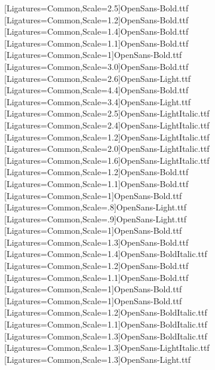 \setsansfont[Ligatures=Common,Scale=1,SlantedFont={OpenSans-LightItalic.ttf},BoldFont={OpenSans-Bold.ttf},BoldSlantedFont={OpenSans-BoldItalic.ttf}]{OpenSans-Light.ttf} %
\newfontface{\sfbHugeRomeo}[Ligatures=Common,Scale=2.5]{OpenSans-Bold.ttf}
\newfontface{\cmssbxparttocRomeo}[Ligatures=Common,Scale=1.2]{OpenSans-Bold.ttf}
\newfontface{\cmssbxsectionRomeo}[Ligatures=Common,Scale=1.4]{OpenSans-Bold.ttf}
\newfontface{\cmssbxelevenRomeo}[Ligatures=Common,Scale=1.1]{OpenSans-Bold.ttf}
\newfontface{\cmssbxchaptocRomeo}[Ligatures=Common,Scale=1]{OpenSans-Bold.ttf}
\newfontface{\cmssbxchaptitleRomeo}[Ligatures=Common,Scale=3.0]{OpenSans-Bold.ttf}
\newfontface{\cmsschapnameRomeo}[Ligatures=Common,Scale=2.6]{OpenSans-Light.ttf}
\newfontface{\cmssbxpartRomeo}[Ligatures=Common,Scale=4.4]{OpenSans-Bold.ttf}
\newfontface{\cmssparttitleRomeo}[Ligatures=Common,Scale=3.4]{OpenSans-Light.ttf}
\newfontface{\sfiHugeRomeo}[Ligatures=Common,Scale=2.5]{OpenSans-LightItalic.ttf}
\newfontface{\sfititleRomeo}[Ligatures=Common,Scale=2.4]{OpenSans-LightItalic.ttf}
\newfontface{\sfitwelveRomeo}[Ligatures=Common,Scale=1.2]{OpenSans-LightItalic.ttf}
\newfontface{\sfihalftitleRomeo}[Ligatures=Common,Scale=2.0]{OpenSans-LightItalic.ttf}
\newfontface{\sfiauthorRomeo}[Ligatures=Common,Scale=1.6]{OpenSans-LightItalic.ttf}
\newfontface{\sfblargeRomeo}[Ligatures=Common,Scale=1.2]{OpenSans-Bold.ttf}
\newfontface{\sfbelevenRomeo}[Ligatures=Common,Scale=1.1]{OpenSans-Bold.ttf}
\newfontface{\sfbRomeo}[Ligatures=Common,Scale=1]{OpenSans-Bold.ttf}
\newfontface{\sfeightRomeo}[Ligatures=Common,Scale=.8]{OpenSans-Light.ttf}
\newfontface{\sfnineRomeo}[Ligatures=Common,Scale=.9]{OpenSans-Light.ttf}
[Ligatures=Common,Scale=1]{OpenSans-Bold.ttf}
\newfontface{\sfbsectionRomeo}[Ligatures=Common,Scale=1.3]{OpenSans-Bold.ttf}
\newfontface{\sfbsectionitalRomeo}[Ligatures=Common,Scale=1.4]{OpenSans-BoldItalic.ttf}
\newfontface{\sfbsubsecRomeo}[Ligatures=Common,Scale=1.2]{OpenSans-Bold.ttf}
\newfontface{\sfbsubsubRomeo}[Ligatures=Common,Scale=1.1]{OpenSans-Bold.ttf}
\newfontface{\sfbparaRomeo}[Ligatures=Common,Scale=1]{OpenSans-Bold.ttf}
\newfontface{\sfbparaitalRomeo}[Ligatures=Common,Scale=1]{OpenSans-Bold.ttf}
\newfontface{\sfbsubsecitalRomeo}[Ligatures=Common,Scale=1.2]{OpenSans-BoldItalic.ttf}
\newfontface{\sfbsubsubsecitalRomeo}[Ligatures=Common,Scale=1.1]{OpenSans-BoldItalic.ttf}
\newfontface{\sfbiRHRomeo}[Ligatures=Common,Scale=1.3]{OpenSans-BoldItalic.ttf}
\newfontface{\sfiRHRomeo}[Ligatures=Common,Scale=1.3]{OpenSans-LightItalic.ttf}
\newfontface{\sfRHRomeo}[Ligatures=Common,Scale=1.3]{OpenSans-Light.ttf}


